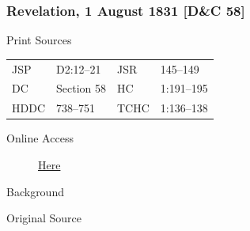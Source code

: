 		\subsubsection{Revelation, 1 August 1831 [D\&C 58]}
			\label{EMS-1831-JS-1-AUG-1831}
		
			\begin{description}
				\item[Print Sources]
			\end{description}

				\begin{tabular}{p{0.5in}p{1in}p{0.5in}p{1in}}
				JSP	 	& D2:12--21		& JSR 		& 145--149 \\
				DC	 	& Section 58 	& HC 		& 1:191--195 \\
				HDDC 	& 738--751		& TCHC 		& 1:136--138 \\
				\end{tabular}
			
			\begin{description}
				\item[Online Access] \href{https://www.josephsmithpapers.org/paper-summary/revelation-1-august-1831-dc-58/1}{Here}
			\end{description}
			
			\begin{description}
				\item[Background]
			\end{description}
			
			
			\begin{description}
				\item[Original Source]
			\end{description}
			
			
